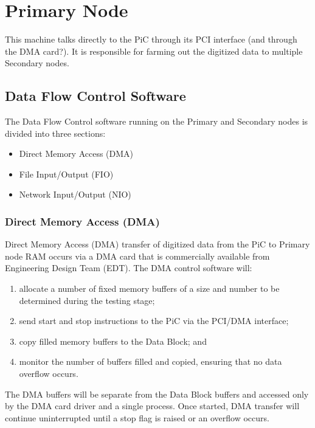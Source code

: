 
\chapter{Primary Node}

This machine talks directly to the PiC through its PCI interface (and
through the DMA card?).  It is responsible for farming out the
digitized data to multiple Secondary nodes.

\section{Data Flow Control Software}

The Data Flow Control software running on the Primary and Secondary
nodes is divided into three sections:
\begin{itemize}
\item Direct Memory Access (DMA)
\item File Input/Output (FIO)
\item Network Input/Output (NIO)
\end{itemize}

\subsection{Direct Memory Access (DMA)}

Direct Memory Access (DMA) transfer of digitized data from the PiC to
Primary node RAM occurs via a DMA card that is commercially available
from Engineering Design Team (EDT).  The DMA control software will:

\begin{enumerate}

\item allocate a number of fixed memory buffers of a size and number
to be determined during the testing stage;

\item send start and stop instructions to the PiC via the PCI/DMA interface;

\item copy filled memory buffers to the Data Block; and

\item monitor the number of buffers filled and copied, ensuring that
no data overflow occurs.

\end{enumerate}

\noindent
The DMA buffers will be separate from the Data Block buffers and
accessed only by the DMA card driver and a single process.  Once
started, DMA transfer will continue uninterrupted until a stop flag is
raised or an overflow occurs.

